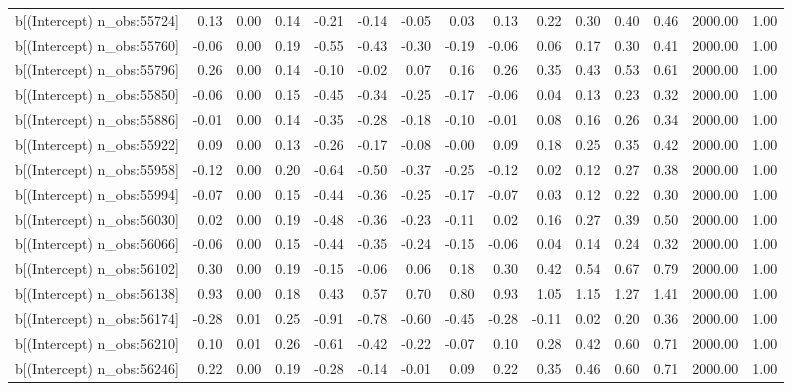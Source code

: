 \begin{table}[ht]
\begin{tabular}{rrrrrrrrrrrrrrr}
  b[(Intercept) n\_obs:55724] & 0.13 & 0.00 & 0.14 & -0.21 & -0.14 & -0.05 & 0.03 & 0.13 & 0.22 & 0.30 & 0.40 & 0.46 & 2000.00 & 1.00 \\ 
  b[(Intercept) n\_obs:55760] & -0.06 & 0.00 & 0.19 & -0.55 & -0.43 & -0.30 & -0.19 & -0.06 & 0.06 & 0.17 & 0.30 & 0.41 & 2000.00 & 1.00 \\ 
  b[(Intercept) n\_obs:55796] & 0.26 & 0.00 & 0.14 & -0.10 & -0.02 & 0.07 & 0.16 & 0.26 & 0.35 & 0.43 & 0.53 & 0.61 & 2000.00 & 1.00 \\ 
  b[(Intercept) n\_obs:55850] & -0.06 & 0.00 & 0.15 & -0.45 & -0.34 & -0.25 & -0.17 & -0.06 & 0.04 & 0.13 & 0.23 & 0.32 & 2000.00 & 1.00 \\ 
  b[(Intercept) n\_obs:55886] & -0.01 & 0.00 & 0.14 & -0.35 & -0.28 & -0.18 & -0.10 & -0.01 & 0.08 & 0.16 & 0.26 & 0.34 & 2000.00 & 1.00 \\ 
  b[(Intercept) n\_obs:55922] & 0.09 & 0.00 & 0.13 & -0.26 & -0.17 & -0.08 & -0.00 & 0.09 & 0.18 & 0.25 & 0.35 & 0.42 & 2000.00 & 1.00 \\ 
  b[(Intercept) n\_obs:55958] & -0.12 & 0.00 & 0.20 & -0.64 & -0.50 & -0.37 & -0.25 & -0.12 & 0.02 & 0.12 & 0.27 & 0.38 & 2000.00 & 1.00 \\ 
  b[(Intercept) n\_obs:55994] & -0.07 & 0.00 & 0.15 & -0.44 & -0.36 & -0.25 & -0.17 & -0.07 & 0.03 & 0.12 & 0.22 & 0.30 & 2000.00 & 1.00 \\ 
  b[(Intercept) n\_obs:56030] & 0.02 & 0.00 & 0.19 & -0.48 & -0.36 & -0.23 & -0.11 & 0.02 & 0.16 & 0.27 & 0.39 & 0.50 & 2000.00 & 1.00 \\ 
  b[(Intercept) n\_obs:56066] & -0.06 & 0.00 & 0.15 & -0.44 & -0.35 & -0.24 & -0.15 & -0.06 & 0.04 & 0.14 & 0.24 & 0.32 & 2000.00 & 1.00 \\ 
  b[(Intercept) n\_obs:56102] & 0.30 & 0.00 & 0.19 & -0.15 & -0.06 & 0.06 & 0.18 & 0.30 & 0.42 & 0.54 & 0.67 & 0.79 & 2000.00 & 1.00 \\ 
  b[(Intercept) n\_obs:56138] & 0.93 & 0.00 & 0.18 & 0.43 & 0.57 & 0.70 & 0.80 & 0.93 & 1.05 & 1.15 & 1.27 & 1.41 & 2000.00 & 1.00 \\ 
  b[(Intercept) n\_obs:56174] & -0.28 & 0.01 & 0.25 & -0.91 & -0.78 & -0.60 & -0.45 & -0.28 & -0.11 & 0.02 & 0.20 & 0.36 & 2000.00 & 1.00 \\ 
  b[(Intercept) n\_obs:56210] & 0.10 & 0.01 & 0.26 & -0.61 & -0.42 & -0.22 & -0.07 & 0.10 & 0.28 & 0.42 & 0.60 & 0.71 & 2000.00 & 1.00 \\ 
  b[(Intercept) n\_obs:56246] & 0.22 & 0.00 & 0.19 & -0.28 & -0.14 & -0.01 & 0.09 & 0.22 & 0.35 & 0.46 & 0.60 & 0.71 & 2000.00 & 1.00 \\ 

\end{tabular}
\end{table}
